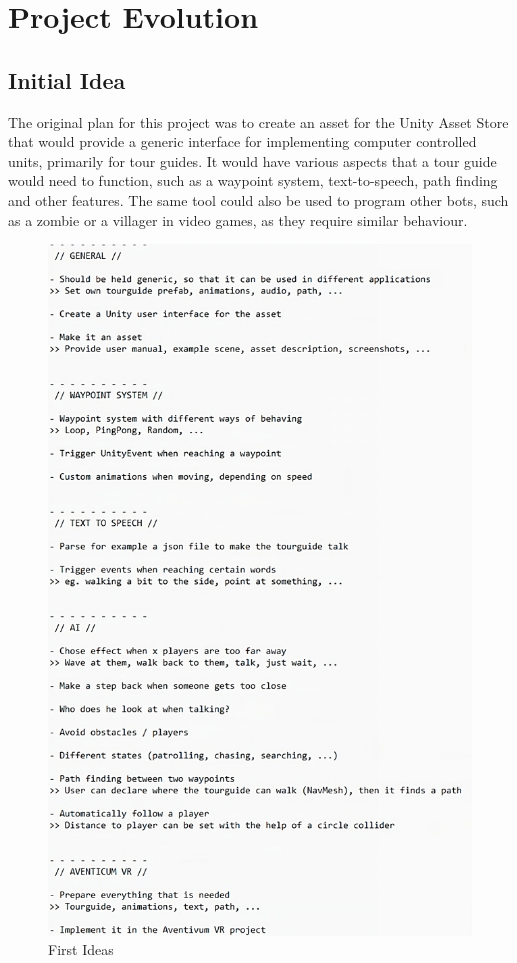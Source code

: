 \chapter{Project Evolution}
\label{chap:projectevolution}
\section{Initial Idea}
\label{sec:projectevolution_initialproblem}

The original plan for this project was to create an asset for the Unity Asset Store that would provide a generic interface for implementing computer controlled units, primarily for tour guides. It would have various aspects that a tour guide would need to function, such as a waypoint system, text-to-speech, path finding and other features. The same tool could also be used to program other bots, such as a zombie or a villager in video games, as they require similar behaviour.

\begin{figure}[H]
	\centering
		\includegraphics[scale=0.205]{images/bot_controller_idea.png}
	\caption{First Ideas}
	\label{fig:bot_controller_idea}
\end{figure}

